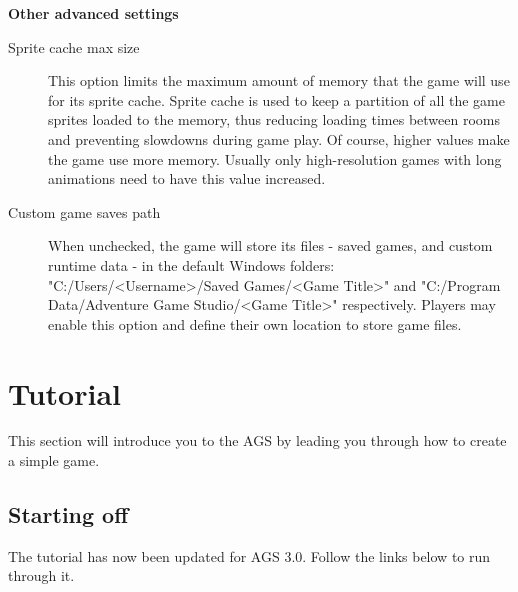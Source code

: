 \bf{Other advanced settings}

\begin{description}
\item [Sprite cache max size]
  This option limits the maximum amount of memory that the game will use for its sprite cache. Sprite cache is used to
  keep a partition of all the game sprites loaded to the memory, thus reducing loading times between rooms and preventing
  slowdowns during game play.
  Of course, higher values make the game use more memory. Usually only high-resolution games with long animations need
  to have this value increased.
\item [Custom game saves path]
  When unchecked, the game will store its files - saved games, and custom runtime data -
in the default Windows folders: "C:/Users/<Username>/Saved Games/<Game Title>" and
"C:/Program Data/Adventure Game Studio/<Game Title>" respectively.
  Players may enable this option and define their own location to store game files.
\end{description}


\chapter{Tutorial}%

This section will introduce you to the AGS by leading you through how to
create a simple game.

\section{Starting off}\label{StartingOff}%

The tutorial has now been updated for AGS 3.0. Follow the links below
to run through it.










